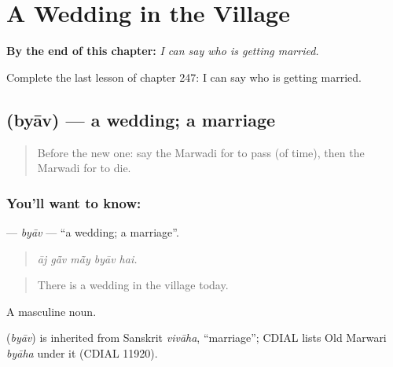 
\chapter{A Wedding in the Village}
\label{ch:mw-a-wedding-in-the-village}

\begin{chapteropening}
\textbf{By the end of this chapter:} \emph{I can say who is getting married.}

Complete the last lesson of chapter 247: I can say who is getting married.
\end{chapteropening}

\section[\texorpdfstring{\mw{ब्याव} (byāv)}{ब्याव (byāv)}]{ (byāv) — a wedding; a marriage}

\label{lesson:MW-C247-byav}



\begin{quote}
Before the new one: say the Marwadi for to pass (of time), then the Marwadi for to die.
\end{quote}

\subsection*{You'll want to know: }
\textbf{} — \emph{byāv} — \textquotedblleft{}a wedding; a marriage\textquotedblright{}.

\begin{quote}
    
\end{quote}

\begin{quote}
\emph{āj gā̃v mā̃y byāv hai.}
\end{quote}

\begin{quote}
There is a wedding in the village today.
\end{quote}

A masculine noun.

\begin{cousinweb}
\textbf{} (\emph{byāv}) is inherited from Sanskrit \emph{vivāha}, \textquotedblleft{}marriage\textquotedblright{}; CDIAL lists Old Marwari \emph{byāha} under it (CDIAL 11920).
\end{cousinweb}

